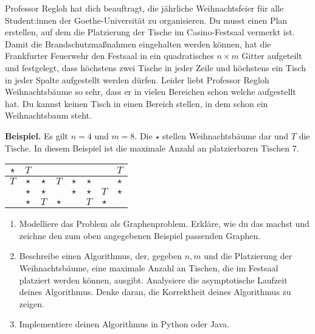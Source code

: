 \documentclass{uebung_cs}
\begin{document}
\begin{aufgabe}[Weihnachtsbäume]
    Professor Regloh hat dich beauftragt, die jährliche Weihnachtsfeier für alle Student:innen der Goethe-Universität zu organisieren. Du musst einen Plan erstellen, auf dem die Platzierung der Tische im Casino-Festsaal vermerkt ist. Damit die Brandschutzmaßnahmen eingehalten werden können, hat die Frankfurter Feuerwehr den Festsaal in ein quadratisches $n \times m$ Gitter aufgeteilt und festgelegt, dass höchstens zwei Tische in jeder Zeile und höchstens ein Tisch in jeder Spalte aufgestellt werden dürfen. Leider liebt Professor Regloh Weihnachtsbäume so sehr, dass er in vielen Bereichen schon welche aufgestellt hat. Du kannst keinen Tisch in einen Bereich stellen, in dem schon ein Weihnachtsbaum steht.
    
    \textbf{Beispiel.} Es gilt $n = 4$ und $m = 8$. Die $\star$ stellen Weihnachtsbäume dar und $T$ die Tische. In diesem Beispiel ist die maximale Anzahl an platzierbaren Tischen 7.
    
    \vspace{4mm}
    \begin{center}
    \begin{tabular}{|c|c|c|c|c|c|c|c|}
    \hline 
    \rule[-1ex]{0pt}{2.5ex} $\star$ & $T$ &  &  &  &  &  & $T$ \\ 
    \hline 
    \rule[-1ex]{0pt}{2.5ex} $T$ & $\star$ & $\star$ & $T$ & $\star$ & $\star$ &  & $\star$ \\ 
    \hline 
    \rule[-1ex]{0pt}{2.5ex}  & $\star$ & $\star$ &  & $\star$ & $\star$ & $T$ & $\star$ \\ 
    \hline 
    \rule[-1ex]{0pt}{2.5ex}  & $\star$ & $T$ & $\star$ &  & $T$ & $\star$ &  \\ 
    \hline 
    \end{tabular} 
    \end{center}
    \vspace{4mm}
    \begin{enumerate}
    	\item Modelliere das Problem als Graphenproblem. Erkläre, wie du das machst und zeichne den zum oben angegebenen Beispiel passenden Graphen.\\
    	\item Beschreibe einen Algorithmus, der, gegeben $n,m$ und die Platzierung der Weihnachtsbäume, eine maximale Anzahl an Tischen, die im Festsaal platziert werden können, ausgibt. Analysiere die asymptotische Laufzeit deines Algorithmus. Denke daran, die Korrektheit deines Algorithmus zu zeigen.\\
    	\item Implementiere deinen Algorithmus in Python oder Java.
    \end{enumerate}
\end{aufgabe}
\end{document}

